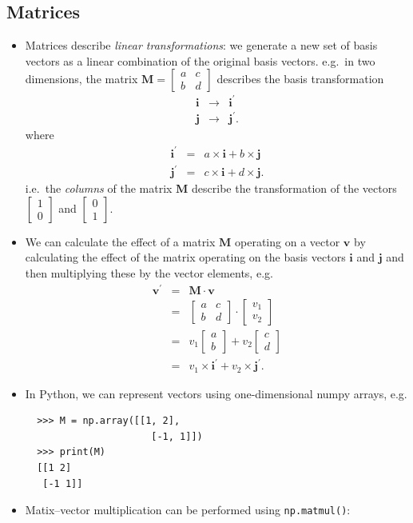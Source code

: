 \documentclass[a4paper]{article}
\newcommand{\bvec}[1]{\boldsymbol{\mathbf{#1}}}
\newcommand{\cvec}[2]{\begin{bmatrix}#1\\#2\end{bmatrix}}
\begin{document}
\subsection{Matrices}
\begin{itemize}
  \item Matrices describe \emph{linear transformations}: we generate a new set of basis vectors as a linear combination of the original basis vectors. e.g.\ in two dimensions, the matrix $\bvec{M}=\begin{bmatrix}a & c\\b & d\end{bmatrix}$ describes the basis transformation
  \begin{eqnarray}
  \bvec{i} & \to & \bvec{i^\prime}\\
  \bvec{j} & \to & \bvec{j^\prime}.
  \end{eqnarray}
  where
  \begin{eqnarray}
  \bvec{i^\prime} & = & a\times\bvec{i} + b\times\bvec{j} \\
  \bvec{j^\prime} & = & c\times\bvec{i} + d\times\bvec{j}.
  \end{eqnarray}
  i.e.\ the \emph{columns} of the matrix $\bvec{M}$ describe the transformation of the vectors $\cvec{1}{0}$ and $\cvec{0}{1}$.
  \item We can calculate the effect of a matrix $\bvec{M}$ operating on a vector $\bvec{v}$ by calculating the effect of the matrix operating on the basis vectors $\bvec{i}$ and $\bvec{j}$ and then multiplying these by the vector elements, e.g.
  \begin{eqnarray}
  \bvec{v^\prime} & = & \bvec{M}\cdot\bvec{v}\\
  & = & \begin{bmatrix}a & c\\b & d\end{bmatrix}\cdot\cvec{v_1}{v_2} \\
  & = & v_1\cvec{a}{b} + v_2\cvec{c}{d} \\
  & = & v_1\times\bvec{i^\prime} + v_2\times\bvec{j^\prime}.
  \end{eqnarray}
  \item In Python, we can represent vectors using one-dimensional numpy arrays, e.g.
  \begin{lstlisting}
  >>> M = np.array([[1, 2],
                      [-1, 1]])
  >>> print(M)
  [[1 2]
   [-1 1]]
  \end{lstlisting}
  \item Matix--vector multiplication can be performed using \texttt{np.matmul()}:

\end{itemize}
\end{document}
